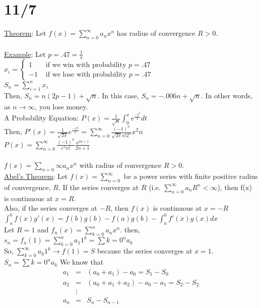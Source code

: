 \documentclass[11pt]{article}
\begin{document}
\section*{11/7}
	\underline{Theorem}: Let $f(x) = \sum_{n=0}^{\infty} a_nx^n$ has radius
	of convergence $R > 0$.\\\\
	\underline{Example}: Let $p = .47 = \frac{1}{x}$\\
	$x_i = \begin{cases} 1 & \text{ if we win with probability } p = .47 \\
	-1 & \text{ if we lose with probability } p = .47 \end{cases}$\\
	$S_n = \sum_{i = 1}^n x_i$\\
	Then, $S_n = n(2p - 1) + \sqrt{n}$. In this case, $S_n = -.006n + 
	\sqrt{n}$. In other words, as $n \to \infty$, you lose money.\\
	A Probability Equation:
	$P(x) = \frac{1}{\sqrt{n}} \int_0^x e^{\frac{-t^2}{2}} dt$\\
	Then, $P'(x) = \frac{1}{\sqrt{2\pi}} e^{\frac{-x^2}{2}} = \sum_{n = 0}
	^{\infty} \frac{(-1)^n}{\sqrt{2\pi} n! 2^n} x^2n$\\
	$P(x) = \sum_{n = 0}^{\infty} \frac{(-1)^n}{e^n n!} 
	\frac{x^{2n+1}}{2n+1}$\\\\
%
	$f(x) = \sum_{n = 0}{\infty} a_n x^n$ with radius of convergence $R > 0$.\\
	\underline{Abel's Theorem}: Let $f(x) = \sum_{n = 0}^{\infty}$ be a power
	series with finite positive radius of convergence, $R$. If the series
	converges at $R$ (i.e. $\sum_{n = 0}^{\infty} a_nR^n < \infty$), then
	f(x) is continuous at $x = R$.\\
	Also, if the series converges at $-R$, then $f(x)$ is continuous at 
	$x =-R$\\
	$\int_a^b f(x)g'(x) = f(b)g(b) - f(a)g(b) - \int_a^b f'(x)g(x)dx$\\
	Let $R = 1$ and $f_n(x) = \sum_{k = 0}^n a_nx^n$.
	then, $s_n = f_n(1) = \sum_{k = 0}^n a_1 1^k = \sum{k=0}^n a_k$\\
	So, $\sum_{k=0}^{\infty} a_k 1^k \to f(1) = S$ because the series converges
	at $x = 1$.\\
	$S_n = \sum{k = 0}^n a_k$ We know that 
	\begin{eqnarray*}
		a_1 &=& (a_0 + a_1) - a_0 = S_1 - S_0\\
		a_2 &=& (a_0 + a_1 + a_2) - a_0 - a_1= S_2 - S_2\\
		&\vdots&\\
		a_n & = & S_n - S_{n-1}
	\end{eqnarray*}
\end{document}
